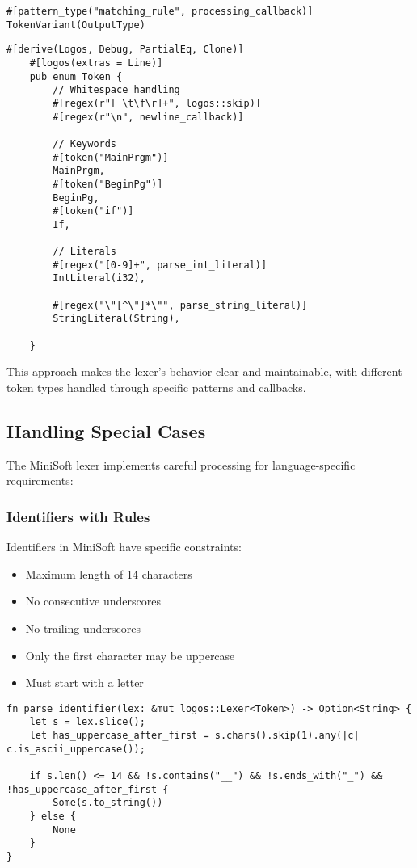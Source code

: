 \documentclass[12pt,a4paper]{article}
\begin{document}
\begin{lstlisting}[caption={Logos Token Definitions Syntax}]
#[pattern_type("matching_rule", processing_callback)]
TokenVariant(OutputType)
\end{lstlisting}

\begin{lstlisting}[caption={Sample Token Definitions}]
    #[derive(Logos, Debug, PartialEq, Clone)]
    #[logos(extras = Line)]
    pub enum Token {
        // Whitespace handling
        #[regex(r"[ \t\f\r]+", logos::skip)]
        #[regex(r"\n", newline_callback)]
        
        // Keywords
        #[token("MainPrgm")]
        MainPrgm,
        #[token("BeginPg")]
        BeginPg,
        #[token("if")]
        If,
        
        // Literals
        #[regex("[0-9]+", parse_int_literal)]
        IntLiteral(i32),
        
        #[regex("\"[^\"]*\"", parse_string_literal)]
        StringLiteral(String),
        
    }
    \end{lstlisting}

This approach makes the lexer's behavior clear and maintainable, with different token types handled through specific patterns and callbacks.

\subsection{Handling Special Cases}
The MiniSoft lexer implements careful processing for language-specific requirements:

\subsubsection{Identifiers with Rules}
Identifiers in MiniSoft have specific constraints:
\begin{itemize}
	\item Maximum length of 14 characters
	\item No consecutive underscores
	\item No trailing underscores
	\item Only the first character may be uppercase
	\item Must start with a letter
\end{itemize}

\begin{lstlisting}[caption={Identifier Validation}]
fn parse_identifier(lex: &mut logos::Lexer<Token>) -> Option<String> {
    let s = lex.slice();
    let has_uppercase_after_first = s.chars().skip(1).any(|c| c.is_ascii_uppercase());

    if s.len() <= 14 && !s.contains("__") && !s.ends_with("_") && !has_uppercase_after_first {
        Some(s.to_string())
    } else {
        None
    }
}
\end{lstlisting}
\end{document}
